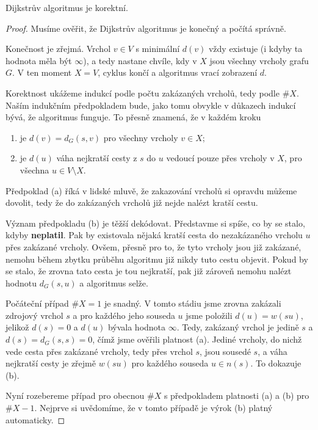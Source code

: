 \pagebreak

\begin{claim}
 \label{claim:dijsktra-korektni}
 Dijkstrův algoritmus je korektní.
\end{claim}
\begin{proof}
 Musíme ověřit, že Dijkstrův algoritmus je konečný a počítá správně.

 Konečnost je zřejmá. Vrchol $v \in V$ s minimální $d(v)$ vždy existuje (i kdyby
 ta hodnota měla být $\infty$), a tedy nastane chvíle, kdy v $X$ jsou všechny
 vrcholy grafu $G$. V ten moment $X = V$, cyklus končí a algoritmus vrací
 zobrazení $d$.
 
 Korektnost ukážeme indukcí podle počtu zakázaných vrcholů, tedy podle $\# X$.
 Naším indukčním předpokladem bude, jako tomu obvykle v důkazech indukcí bývá,
 že algoritmus funguje. To přesně znamená, že v každém kroku
 \begin{enumerate}[label=(\alph*)]
  \item je $d(v) = d_G(s,v)$ pro všechny vrcholy $v \in X$;
  \item je $d(u)$ váha nejkratší cesty z $s$ do $u$ vedoucí pouze přes vrcholy v
   $X$, pro všechna $u \in V \setminus X$.
 \end{enumerate}
 Předpoklad (a) říká v lidské mluvě, že zakazování vrcholů si opravdu můžeme
 dovolit, tedy že do zakázaných vrcholů již nejde nalézt kratší cestu.

 Význam předpokladu (b) je těžší dekódovat. Představme si spíše, co by se stalo,
 kdyby \textbf{neplatil}. Pak by existovala nějaká kratší cesta do nezakázaného
 vrcholu $u$ přes zakázané vrcholy. Ovšem, přesně pro to, že tyto vrcholy jsou
 již zakázané, nemohu během zbytku průběhu algoritmu již nikdy tuto cestu
 objevit. Pokud by se stalo, že zrovna tato cesta je tou nejkratší, pak již
 zároveň nemohu nalézt hodnotu $d_G(s,u)$ a algoritmus selže.

 Počáteční případ $\# X = 1$ je snadný. V tomto stádiu jsme zrovna zakázali
 zdrojový vrchol $s$ a pro každého jeho souseda $u$ jsme položili $d(u) =
 w(su)$, jelikož $d(s) = 0$ a $d(u)$ bývala hodnota $\infty$. Tedy, zakázaný
 vrchol je jedině $s$ a $d(s) = d_G(s,s) = 0$, čímž jsme ověřili platnost (a).
 Jediné vrcholy, do nichž vede cesta přes zakázané vrcholy, tedy přes vrchol
 $s$, jsou sousedé $s$, a váha nejkratší cesty je zřejmě $w(su)$ pro každého
 souseda $u \in n(s)$. To dokazuje (b).

 Nyní rozebereme případ pro obecnou $\# X$ s předpokladem platnosti (a) a (b)
 pro $\# X - 1$. Nejprve si uvědomíme, že v tomto případě je výrok (b) platný
 automaticky.
\end{proof}
